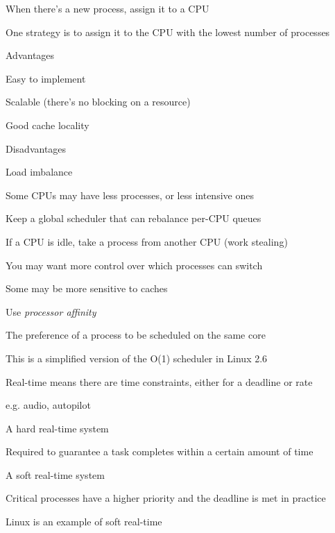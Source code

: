   \begin{slide}


    When there's a new process, assign it to a CPU

    \leftspace{}One strategy is to assign it to the CPU with the lowest number of processes
    \medskip

    Advantages

    \leftspace{}Easy to implement

    \leftspace{}Scalable (there's no blocking on a resource)

    \leftspace{}Good cache locality
    \medskip

    Disadvantages

    \leftspace{}Load imbalance

    \leftspace{}\leftspace{}Some CPUs may have less processes, or less intensive ones

  \end{slide}

  \begin{slide}


    Keep a global scheduler that can rebalance per-CPU queues

    \leftspace{}If a CPU is idle, take a process from another CPU (work stealing)
    \medskip

    You may want more control over which processes can switch

    \leftspace{}Some may be more sensitive to caches
    \medskip

    Use \textit{processor affinity}

    \leftspace{}The preference of a process to be scheduled on the same core
    \medskip

    This is a simplified version of the O(1) scheduler in Linux 2.6

  \end{slide}


  \begin{slide}


    Real-time means there are time constraints, either for a deadline or rate

    \leftspace{}e.g. audio, autopilot
    \medskip

    A hard real-time system

    \leftspace{}Required to guarantee a task completes within a certain amount
    of time
    \medskip

    A soft real-time system

    \leftspace{}Critical processes have a higher priority and the deadline is
    met in practice
    \medskip

    Linux is an example of soft real-time

  \end{slide}

